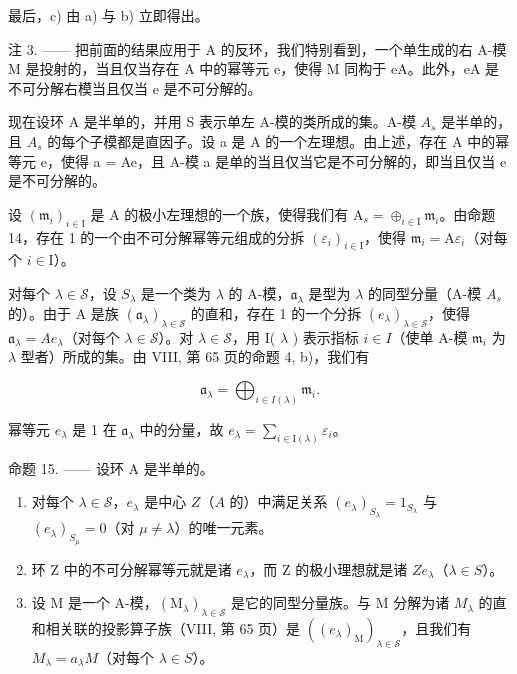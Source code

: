 最后，c) 由 a) 与 b) 立即得出。

注 3. —— 把前面的结果应用于 A 的反环，我们特别看到，一个单生成的右 A-模 M 是投射的，当且仅当存在 A 中的幂等元 e，使得 M 同构于 eA。此外，eA 是不可分解右模当且仅当 e 是不可分解的。

现在设环 A 是半单的，并用 S 表示单左 A-模的类所成的集。A-模 \(A_{s}\) 是半单的，且 \(A_{s}\) 的每个子模都是直因子。设 a 是 A 的一个左理想。由上述，存在 A 中的幂等元 e，使得 a = Ae，且 A-模 a 是单的当且仅当它是不可分解的，即当且仅当 e 是不可分解的。

设 \((\mathfrak{m}_i)_{i\in \mathrm{I}}\) 是 A 的极小左理想的一个族，使得我们有 \(\mathrm{A}_s = \oplus_{i\in \mathrm{I}}\mathfrak{m}_i\)。由命题 14，存在 1 的一个由不可分解幂等元组成的分拆 \((\varepsilon_i)_{i\in \mathrm{I}}\)，使得 \(\mathfrak{m}_i = \mathrm{A}\varepsilon_i\)（对每个 \(i\in \mathrm{I}\)）。

对每个 \(\lambda \in \mathcal{S}\)，设 \(S_{\lambda}\) 是一个类为 \(\lambda\) 的 A-模，\(\mathfrak{a}_{\lambda}\) 是型为 \(\lambda\) 的同型分量（A-模 \(A_s\) 的）。由于 A 是族 \((\mathfrak{a}_{\lambda})_{\lambda \in \mathcal{S}}\) 的直和，存在 1 的一个分拆 \((e_{\lambda})_{\lambda \in \mathcal{S}}\)，使得 \(\mathfrak{a}_{\lambda} = Ae_{\lambda}\)（对每个 \(\lambda \in \mathcal{S}\)）。对 \(\lambda \in \mathcal{S}\)，用 I( \(\lambda\) ) 表示指标 \(i \in I\)（使单 A-模 \(\mathfrak{m}_i\) 为 \(\lambda\) 型者）所成的集。由 VIII, 第 65 页的命题 4, b)，我们有

\[
\mathfrak {a} _ {\lambda} = \bigoplus_ {i \in I (\lambda)} \mathfrak {m} _ {i}.\tag{3}
\]

幂等元 \(e_{\lambda}\) 是 1 在 \(\mathfrak{a}_{\lambda}\) 中的分量，故 \(e_{\lambda} = \sum_{i\in \mathrm{I}(\lambda)}\varepsilon_i\)。

命题 15. —— 设环 A 是半单的。

\begin{enumerate}
\def\labelenumi{\alph{enumi})}
\item
  对每个 \(\lambda \in \mathcal{S}\)，\(e_{\lambda}\) 是中心 \(Z\)（\(A\) 的）中满足关系 \((e_{\lambda})_{S_{\lambda}} = 1_{S_{\lambda}}\) 与 \((e_{\lambda})_{S_{\mu}} = 0\)（对 \(\mu \neq \lambda\)）的唯一元素。
\item
  环 Z 中的不可分解幂等元就是诸 \(e_{\lambda}\)，而 Z 的极小理想就是诸 \(Ze_{\lambda}\)（\(\lambda \in S\)）。
\item
  设 M 是一个 A-模，\((\mathrm{M}_{\lambda})_{\lambda\in\mathcal{S}}\) 是它的同型分量族。与 M 分解为诸 \(M_{\lambda}\) 的直和相关联的投影算子族（VIII, 第 65 页）是 \(((e_{\lambda})_{\mathrm{M}})_{\lambda\in\mathcal{S}}\)，且我们有 \(M_{\lambda}=a_{\lambda}M\)（对每个 \(\lambda\in S\)）。
\end{enumerate}

